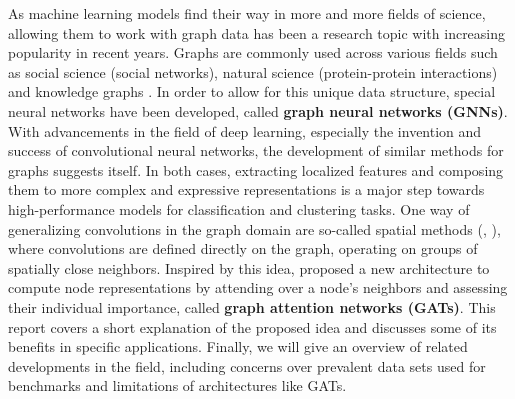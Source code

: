 \label{chapter:introduction}

As machine learning models find their way in more and more fields of science, allowing them to work with graph data has been a research topic with increasing popularity in recent years. Graphs are commonly used across various fields such as social science (social networks), natural science (protein-protein interactions) and knowledge graphs \cite{zhou2021graph}. In order to allow for this unique data structure, special neural networks have been developed, called \textbf{graph neural networks (GNNs)}. With advancements in the field of deep learning, especially the invention and success of convolutional neural networks, the development of similar methods for graphs suggests itself. In both cases, extracting localized features and composing them to more complex and expressive representations is a major step towards high-performance models for classification and clustering tasks. One way of generalizing convolutions in the graph domain are so-called spatial methods (\cite{hamilton2018inductive}, \cite{monti2016geometric}), where convolutions are defined directly on the graph, operating on groups of spatially close neighbors. Inspired by this idea, \cite{velickovic2018graph} proposed a new architecture to compute node representations by attending over a node's neighbors and assessing their individual importance, called \textbf{graph attention networks (GATs)}. This report covers a short explanation of the proposed idea and discusses some of its benefits in specific applications. Finally, we will give an overview of related developments in the field, including concerns over prevalent data sets used for benchmarks and limitations of architectures like GATs.
\\~\\
